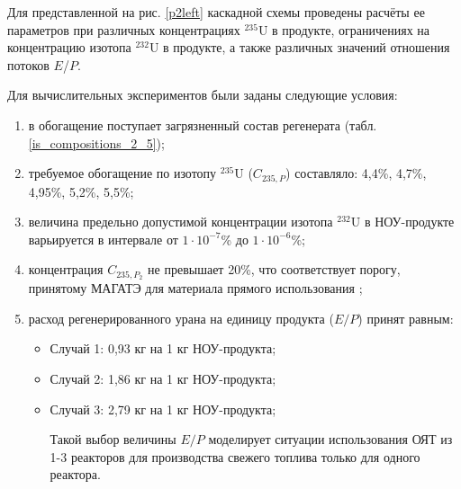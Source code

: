 {Для представленной на рис. \ref{p2left} каскадной схемы проведены расчёты ее параметров при различных концентрациях $^{235}$U в продукте, ограничениях на концентрацию изотопа $^{232}$U в продукте, а также различных значений отношения потоков $E$/$P$.

Для вычислительных экспериментов были заданы следующие условия:

\begin{enumerate}
    \item в обогащение поступает загрязненный состав регенерата (табл. \ref{is_compositions_2_5}); 
    \item требуемое обогащение по изотопу $^{235}$U ($C_{235,P}$) составляло: 4,4\%, 4,7\%, 4,95\%, 5,2\%, 5,5\%;    
    \item величина предельно допустимой концентрации изотопа $^{232}$U в НОУ-продукте варьируется в интервале от $1\cdot10^{-7}$\% до $1\cdot10^{-6}$\%;
    \item концентрация $C_{235,{P_2}}$ не превышает 20\%, что соответствует порогу, принятому МАГАТЭ для материала прямого использования \cite{alekseevConceptUseRecycled2010};
    \item расход регенерированного урана на единицу продукта ($E/P$) принят равным:
    \begin{itemize}
        \item Случай 1: 0,93 кг на 1 кг НОУ-продукта;
        \item Случай 2: 1,86 кг на 1 кг НОУ-продукта;
        \item Случай 3: 2,79 кг на 1 кг НОУ-продукта;
        
        Такой выбор величины $E/P$ моделирует ситуации использования ОЯТ из 1-3 реакторов для производства свежего топлива только для одного реактора.
    \end{itemize}
\end{enumerate}

}
